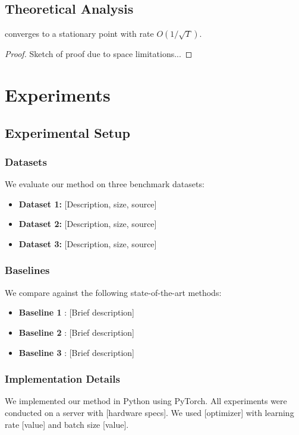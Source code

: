 \documentclass[10pt,twocolumn]{article}
\begin{document}
\subsection{Theoretical Analysis}
\begin{theorem}
 converges to a stationary point with rate $O(1/\sqrt{T})$.
\end{theorem}
\begin{proof}
Sketch of proof due to space limitations...
\end{proof}

\section{Experiments}
\label{sec:experiments}

\subsection{Experimental Setup}

\subsubsection{Datasets}
We evaluate our method on three benchmark datasets:
\begin{itemize}
    \item \textbf{Dataset 1:} [Description, size, source]
    \item \textbf{Dataset 2:} [Description, size, source]
    \item \textbf{Dataset 3:} [Description, size, source]
\end{itemize}

\subsubsection{Baselines}
We compare against the following state-of-the-art methods:
\begin{itemize}
    \item \textbf{Baseline 1} \cite{ref1}: [Brief description]
    \item \textbf{Baseline 2} \cite{ref2}: [Brief description]
    \item \textbf{Baseline 3} \cite{ref3}: [Brief description]
\end{itemize}

\subsubsection{Implementation Details}
We implemented our method in Python using PyTorch. All experiments were conducted on a server with [hardware specs]. We used [optimizer] with learning rate [value] and batch size [value].
\end{document}
